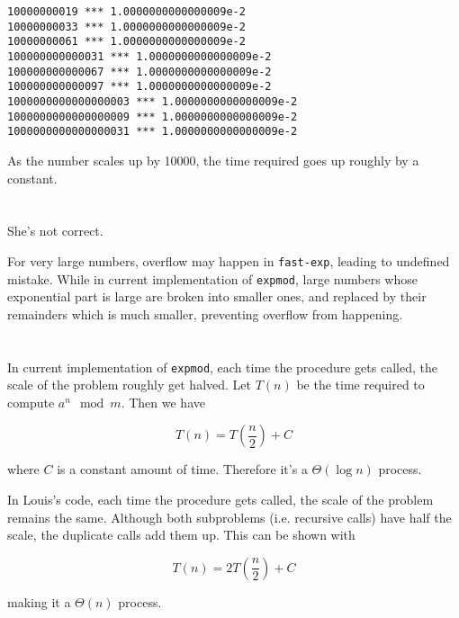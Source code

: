 \documentclass[../main.tex]{subfiles}
\begin{document}
\begin{lstlisting}
10000000019 *** 1.0000000000000009e-2
10000000033 *** 1.0000000000000009e-2
10000000061 *** 1.0000000000000009e-2
100000000000031 *** 1.0000000000000009e-2
100000000000067 *** 1.0000000000000009e-2
100000000000097 *** 1.0000000000000009e-2
1000000000000000003 *** 1.0000000000000009e-2
1000000000000000009 *** 1.0000000000000009e-2
1000000000000000031 *** 1.0000000000000009e-2
\end{lstlisting}

As the number scales up by 10000, the time required
 goes up roughly by a constant.


\section{}

She's not correct.

For very large numbers, overflow may happen in \lstinline{fast-exp}, leading to undefined mistake.
 While in current implementation of \lstinline{expmod}, large numbers whose exponential part is
 large are broken into smaller ones, and replaced by their remainders which is much smaller, preventing
 overflow from happening.


\section{}

In current implementation of \lstinline{expmod}, each time the procedure gets called, the scale of the
 problem roughly get halved. Let $T(n)$ be the time required to compute $a^n \mod m$. Then we have

$$
T(n) = T\left(\frac{n}{2}\right) + C
$$

where $C$ is a constant amount of time. Therefore it's a $\Theta(\log n)$ process.

In Louis's code, each time the procedure gets called, the scale of the problem remains the same. Although
 both subproblems (i.e. recursive calls) have half the scale, the duplicate calls add them up.
 This can be shown with

$$
T(n) = 2T\left(\frac{n}{2}\right) + C
$$

making it a $\Theta(n)$ process.


\section{}
\end{document}
